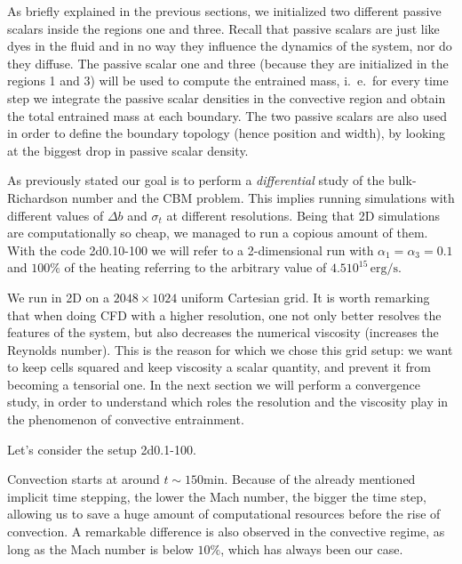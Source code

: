 As briefly explained in the previous sections, we initialized two different passive scalars inside the regions one and three. Recall that passive scalars are just like dyes in the fluid and in no way they influence the dynamics of the system, nor do they diffuse. The passive scalar one and three (because they are initialized in the regions 1 and 3) will be used to compute the entrained mass, i.\ e.\ for every time step we integrate the passive scalar densities in the convective region and obtain the total entrained mass at each boundary. The two passive scalars are also used in order to define the boundary topology (hence position and width), by looking at the biggest drop in passive scalar density.

As previously stated our goal is to perform a \textit{differential} study of the bulk-Richardson number and the CBM problem. This implies running simulations with different values of $\Delta b$ and $\sigma_t$ at different resolutions. Being that 2D simulations are computationally so cheap, we managed to run a copious amount of them. With the code 2d0.10-100 we will refer to a 2-dimensional run with $\alpha_{1} = \alpha_{3}=0.1$ and $100 \%$ of the heating referring to the arbitrary value of $4.5 10^{15} \, \mathrm{erg/s}$.

We run in 2D on a $2048 \times 1024$ uniform Cartesian grid. It is worth remarking that when doing CFD with a higher resolution, one not only better resolves the features of the system, but also decreases the numerical viscosity (increases the Reynolds number). This is the reason for which we chose this grid setup: we want to keep cells squared and keep viscosity a scalar quantity, and prevent it from becoming a tensorial one. In the next section we will perform a convergence study, in order to understand which roles the resolution and the viscosity play in the phenomenon of convective entrainment.


Let's consider the setup 2d0.1-100. 

Convection starts at around $t \sim 150 \mathrm{min}$. Because of the already mentioned implicit time stepping, the lower the Mach number, the bigger the time step, allowing us to save a huge amount of computational resources before the rise of convection. A remarkable difference is also observed in the convective regime, as long as the Mach number is below $10 \%$, which has always been our case.

